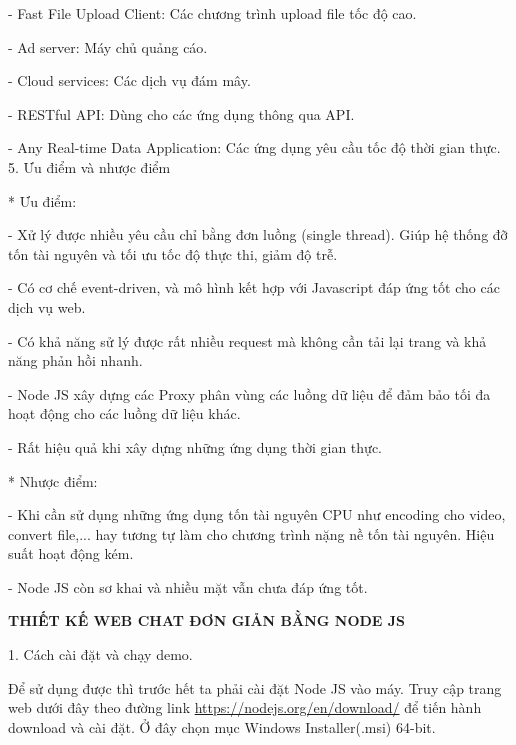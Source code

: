 \documentclass{report}
\begin{document}
- Fast File Upload Client: Các chương trình upload file tốc độ cao.

- Ad server: Máy chủ quảng cáo.

- Cloud services: Các dịch vụ đám mây.

- RESTful API: Dùng cho các ứng dụng thông qua API.

- Any Real-time Data Application: Các ứng dụng yêu cầu tốc độ thời gian thực.\\

\bigskip
\setlength{\parindent}{0cm}
5. Ưu điểm và nhược điểm

\smallskip
* Ưu điểm:

\setlength{\parindent}{1cm}
- Xử lý được nhiều yêu cầu chỉ bằng đơn luồng (single thread). Giúp hệ thống đỡ tốn tài nguyên và tối ưu tốc độ thực thi, giảm độ trễ.

- Có cơ chế event-driven, và mô hình kết hợp với Javascript đáp ứng tốt cho các dịch vụ web.

- Có khả năng sử lý được rất nhiều request mà không cần tải lại trang và khả năng phản hồi nhanh.

- Node JS xây dựng các Proxy phân vùng các luồng dữ liệu để đảm bảo tối đa hoạt động cho các luồng dữ liệu khác.

- Rất hiệu quả khi xây dựng những ứng dụng thời gian thực.

\setlength{\parindent}{0cm}
\smallskip
* Nhược điểm:

\setlength{\parindent}{1cm}
- Khi cần sử dụng những ứng dụng tốn tài nguyên CPU như encoding cho video, convert file,... hay tương tự làm cho chương trình nặng nề tốn tài nguyên. Hiệu suất hoạt động kém.

- Node JS còn sơ khai và nhiều mặt vẫn chưa đáp ứng tốt.


\newpage
\changefontsizes{16pt}
\centerline{\textbf{THIẾT KẾ WEB CHAT ĐƠN GIẢN BẰNG NODE JS}}

\bigskip
\changefontsizes{14pt}
\setlength{\parindent}{0cm}
1. Cách cài đặt và chạy demo.

\setlength{\parindent}{1cm}
Để sử dụng được thì trước hết ta phải cài đặt Node JS vào máy. Truy cập trang web dưới đây theo đường link \url{https://nodejs.org/en/download/} để tiến hành download và cài đặt. Ở đây chọn mục Windows Installer(.msi) 64-bit.
\end{document}
